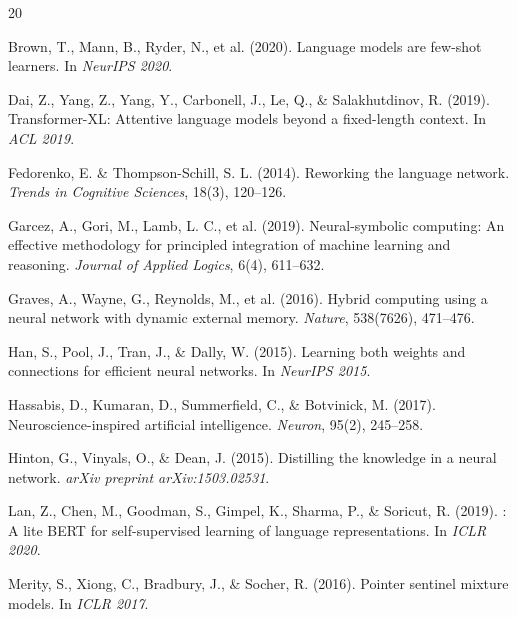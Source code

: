 \documentclass[11pt,a4paper]{article}
\begin{document}
\begin{thebibliography}{20}

Brown, T., Mann, B., Ryder, N., et al. (2020).
\newblock Language models are few-shot learners.
\newblock In \emph{NeurIPS 2020}.

Dai, Z., Yang, Z., Yang, Y., Carbonell, J., Le, Q., \& Salakhutdinov, R. (2019).
\newblock Transformer-{XL}: Attentive language models beyond a fixed-length context.
\newblock In \emph{ACL 2019}.

Fedorenko, E. \& Thompson-Schill, S. L. (2014).
\newblock Reworking the language network.
\newblock \emph{Trends in Cognitive Sciences}, 18(3), 120--126.

Garcez, A., Gori, M., Lamb, L. C., et al. (2019).
\newblock Neural-symbolic computing: An effective methodology for principled integration of machine learning and reasoning.
\newblock \emph{Journal of Applied Logics}, 6(4), 611--632.

Graves, A., Wayne, G., Reynolds, M., et al. (2016).
\newblock Hybrid computing using a neural network with dynamic external memory.
\newblock \emph{Nature}, 538(7626), 471--476.

Han, S., Pool, J., Tran, J., \& Dally, W. (2015).
\newblock Learning both weights and connections for efficient neural networks.
\newblock In \emph{NeurIPS 2015}.

Hassabis, D., Kumaran, D., Summerfield, C., \& Botvinick, M. (2017).
\newblock Neuroscience-inspired artificial intelligence.
\newblock \emph{Neuron}, 95(2), 245--258.

Hinton, G., Vinyals, O., \& Dean, J. (2015).
\newblock Distilling the knowledge in a neural network.
\newblock \emph{arXiv preprint arXiv:1503.02531}.

Lan, Z., Chen, M., Goodman, S., Gimpel, K., Sharma, P., \& Soricut, R. (2019).
: A lite {BERT} for self-supervised learning of language representations.
\newblock In \emph{ICLR 2020}.

Merity, S., Xiong, C., Bradbury, J., \& Socher, R. (2016).
\newblock Pointer sentinel mixture models.
\newblock In \emph{ICLR 2017}.


\end{thebibliography}
\end{document}
